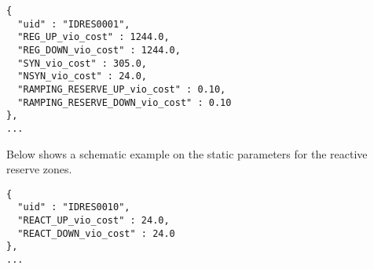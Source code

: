 \begin{verbatim}
{
  "uid" : "IDRES0001",
  "REG_UP_vio_cost" : 1244.0,
  "REG_DOWN_vio_cost" : 1244.0,
  "SYN_vio_cost" : 305.0,
  "NSYN_vio_cost" : 24.0,  
  "RAMPING_RESERVE_UP_vio_cost" : 0.10,  
  "RAMPING_RESERVE_DOWN_vio_cost" : 0.10
},
...
\end{verbatim}


Below shows a schematic example on the static parameters for the reactive reserve zones. 
\begin{verbatim}
{
  "uid" : "IDRES0010",
  "REACT_UP_vio_cost" : 24.0,
  "REACT_DOWN_vio_cost" : 24.0
},
...
\end{verbatim}



